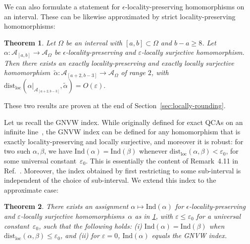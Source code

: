 \documentclass[11pt,reqno]{amsart}
\newtheorem{theorem}{Theorem}[section]
\theoremstyle{definition}
\theoremstyle{remark}
\numberwithin{equation}{section}
\newcommand{\eps}{\varepsilon}
\newcommand{\cA}{\mathcal A}
\newcommand{\distloc}{\mathrm{dist}_\mathrm{loc}}
\begin{document}
We can also formulate a statement for $\epsilon$-locality-preserving homomorphisms on an interval.
These can be likewise approximated by strict locality-preserving homomorphisms:

\begin{theorem}\label{thm:round-homomorphism}
    Let $\Omega$ be an interval with $[a,b] \subset \Omega$ and $b-a \geq 8$.  Let
    $\alpha : \cA_{[a,b]} \to \cA_\Omega$ be $\epsilon$-locality-preserving and $\eps$-locally surjective homomorphism.
    Then there exists an exactly locality-preserving and exactly locally surjective homomorphism~$\tilde{\alpha} : \cA_{[a+2,b-3]} \to \cA_\Omega$ of range $2$, with $\distloc(\alpha|_{\cA_{[a+2,b-3]}},\tilde \alpha) = O(\eps).$
\end{theorem}
\noindent
These two results are proven at the end of Section~\ref{sec:locally-rounding}.


Let us recall the GNVW index.
While originally defined for exact QCAs on an infinite line~\cite{gross2012index}, the GNVW index can be defined for any homomorphism that is exactly locality-preserving and locally surjective, and moreover it is robust:
for two such $\alpha,\beta$, we have $\mathrm{Ind}(\alpha) = \mathrm{Ind}(\beta)$ whenever $\mathrm{dist}_\mathrm{loc}(\alpha,\beta) < \eps_0$, for some universal constant~$\eps_0$.
This is essentially the content of Remark~4.11 in Ref.~\cite{ranard2022converse}.
Moreover, the index obtained by first restricting to some sub-interval is independent of the choice of sub-interval.
We extend this index to the approximate case:

\begin{theorem}\label{thm:index}
There exists an assignment $\alpha \mapsto \mathrm{Ind}(\alpha)$ for $\epsilon$-locality-preserving and $\eps$-locally surjective homomorphisms~$\alpha$ as in \cref{thm:round-homomorphism}, with $\eps \leq \eps_0$ for a universal constant~$\eps_0$, such that the following holds:
(i) $\mathrm{Ind}(\alpha) = \mathrm{Ind}(\beta)$ when $\distloc(\alpha,\beta) \leq \eps_0$, and (ii) for $\eps=0$, $\mathrm{Ind}(\alpha)$ equals the GNVW index.
\end{theorem}
\end{document}
